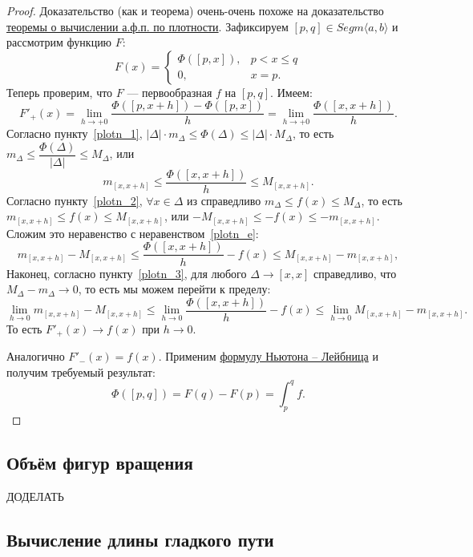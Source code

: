 \begin{proof}
	Доказательство (как и теорема) очень-очень похоже на доказательство \hyperlink{afp}{теоремы о вычислении а.ф.п. по плотности}. Зафиксируем \([p, q] \in Segm \langle a, b \rangle\) и рассмотрим функцию \(F\): \[
	F(x) =
	\begin{cases}
		\Phi([p, x]), & p < x \leqslant q \\
		0,			  & x = p.
	\end{cases}
	\]
	Теперь проверим, что \(F\) --- первообразная \(f\) на \([p, q]\). Имеем: \[
	F'_+(x) = \lim_{h \to +0} \frac{\Phi([p, x + h]) - \Phi([p, x])}{h} = \lim_{h \to +0} \frac{\Phi([x, x + h])}{h}.
	\]
	Согласно пункту~\ref{plotn_1}, \(|\Delta| \cdot m_\Delta \leqslant \Phi(\Delta) \leqslant |\Delta| \cdot M_\Delta\), то есть \(m_\Delta \leqslant \dfrac{\Phi(\Delta)}{|\Delta|} \leqslant M_\Delta\), или
	\begin{equation} \label{plotn_e}
		m_{[x, x + h]} \leqslant \frac{\Phi([x, x + h])}{h} \leqslant M_{[x, x + h]}.
	\end{equation}
	Согласно пункту~\ref{plotn_2}, \(\forall x \in \Delta\) из справедливо \(m_\Delta \leqslant f(x) \leqslant M_\Delta\), то есть \(m_{[x, x + h]} \leqslant f(x) \leqslant M_{[x, x + h]}\), или \(-M_{[x, x + h]} \leqslant -f(x) \leqslant -m_{[x, x + h]}\). Сложим это неравенство с неравенством~\eqref{plotn_e}: \[
	m_{[x, x + h]} - M_{[x, x + h]} \leqslant \frac{\Phi([x, x + h])}{h} - f(x) \leqslant M_{[x, x + h]} - m_{[x, x + h]},
	\]
	Наконец, согласно пункту~\ref{plotn_3}, для любого \(\Delta \to [x, x]\) справедливо, что \(M_\Delta - m_\Delta \to 0\), то есть мы можем перейти к пределу: \[
	\lim_{h \to 0} m_{[x, x + h]} - M_{[x, x + h]} \leqslant \lim_{h \to 0} \frac{\Phi([x, x + h])}{h} - f(x) \leqslant \lim_{h \to 0} M_{[x, x + h]} - m_{[x, x + h]}.
	\]
	То есть \(F'_+(x) \to  f(x)\) при \(h \to 0\).
	
	Аналогично \(F'_-(x) = f(x)\). Применим \hyperlink{t9}{формулу Ньютона -- Лейбница} и получим требуемый результат: \[
	\Phi([p, q]) = F(q) - F(p) = \int_p^q f.
	\]
\end{proof}

\subsection{Объём фигур вращения}

ДОДЕЛАТЬ

\subsection{Вычисление длины гладкого пути}

